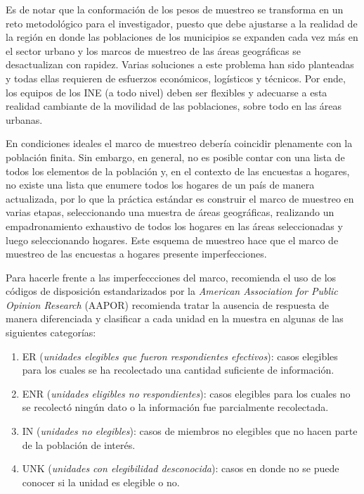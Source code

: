 \documentclass[
  10pt,
  spanish,
]{book}
\providecommand{\tightlist}{%
  \setlength{\itemsep}{0pt}\setlength{\parskip}{0pt}}
\begin{document}
Es de notar que la conformación de los pesos de muestreo se transforma en un reto metodológico para el investigador, puesto que debe ajustarse a la realidad de la región en donde las poblaciones de los municipios se expanden cada vez más en el sector urbano y los marcos de muestreo de las áreas geográficas se desactualizan con rapidez. Varias soluciones a este problema han sido planteadas \citep{Gambino_Silva_2009} y todas ellas requieren de esfuerzos económicos, logísticos y técnicos. Por ende, los equipos de los INE (a todo nivel) deben ser flexibles y adecuarse a esta realidad cambiante de la movilidad de las poblaciones, sobre todo en las áreas urbanas.

En condiciones ideales el marco de muestreo debería coincidir plenamente con la población finita. Sin embargo, en general, no es posible contar con una lista de todos los elementos de la población y, en el contexto de las encuestas a hogares, no existe una lista que enumere todos los hogares de un país de manera actualizada, por lo que la práctica estándar es construir el marco de muestreo en varias etapas, seleccionando una muestra de áreas geográficas, realizando un empadronamiento exhaustivo de todos los hogares en las áreas seleccionadas y luego seleccionando hogares. Este esquema de muestreo hace que el marco de muestreo de las encuestas a hogares presente imperfecciones.

Para hacerle frente a las imperfeccciones del marco, \citet{Valliant_Dever_2017} recomienda el uso de los códigos de disposición estandarizados por la \emph{American Association for Public Opinion Research} (AAPOR) recomienda tratar la ausencia de respuesta de manera diferenciada y clasificar a cada unidad en la muestra en algunas de las siguientes categorías:

\begin{enumerate}
\def\labelenumi{\arabic{enumi}.}
\tightlist
\item
  ER (\emph{unidades elegibles que fueron respondientes efectivos}): casos elegibles para los cuales se ha recolectado una cantidad suficiente de información.
\item
  ENR (\emph{unidades eligibles no respondientes}): casos elegibles para los cuales no se recolectó ningún dato o la información fue parcialmente recolectada.
\item
  IN (\emph{unidades no elegibles}): casos de miembros no elegibles que no hacen parte de la población de interés.
\item
  UNK (\emph{unidades con elegibilidad desconocida}): casos en donde no se puede conocer si la unidad es elegible o no.
\end{enumerate}
\end{document}
